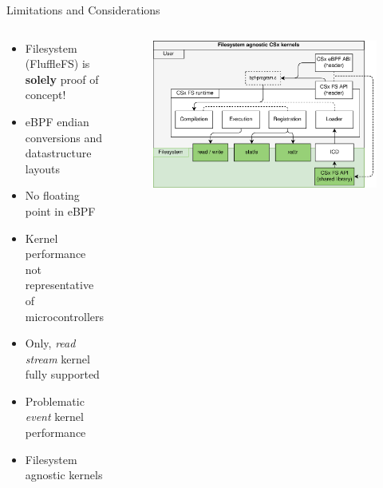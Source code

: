 \documentclass[aspectratio=169, notes]{beamer}
\begin{document}
\begin{frame}{Limitations and Considerations}
    \begin{columns}
        \begin{column}{0.50\textwidth}
            \footnotesize
            \begin{itemize}
                \item Filesystem (FluffleFS) is \textbf{solely} proof of
                      concept!
                \item eBPF endian conversions and datastructure layouts
                \item No floating point in eBPF
                \item Kernel performance not representative of microcontrollers
                \item Only, \textit{read stream} kernel fully supported
                \item Problematic \textit{event} kernel performance
                \item Filesystem agnostic kernels
            \end{itemize}
            \textit{}
        \end{column}
        \begin{column}{0.50\textwidth}
            \begingroup
            \small
            \begin{figure}
                \centering
                \includegraphics[width=1\textwidth]{resources/images/csx-fs-agnostic.png}
            \end{figure}
            \endgroup
        \end{column}
    \end{columns}
\end{frame}
\end{document}
